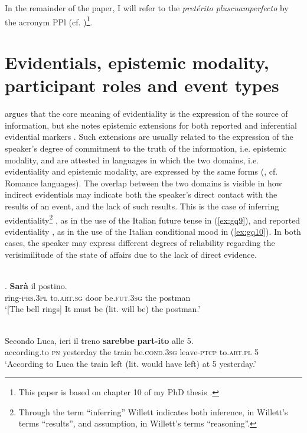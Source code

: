\documentclass[output=paper]{langsci/langscibook}
\begin{document}
In the remainder of the paper, I will refer to the \textit{pretérito pluscuamperfecto} by the acronym PPl (cf. \citealt{Speranza2014})\footnote{This paper is based on chapter 10 of my PhD thesis \citep{Quartararo2017}.}.


\section{Evidentials, epistemic modality, participant roles and event types}\label{s:gq2}

\citet[3]{Aikhenvald2004} argues that the core meaning of evidentiality is the expression of the source of information, but she notes epistemic extensions for both reported \citep[180]{Aikhenvald2004} and inferential evidential markers \citep[176]{Aikhenvald2004}. Such extensions are usually related to the expression of the speaker’s degree of commitment to the truth of the information, i.e. epistemic modality, and are attested in languages in which the two domains, i.e. evidentiality and epistemic modality, are expressed by the same forms (\citealt[354]{Plungian2001}, cf. Romance languages). The overlap between the two domains is visible in how indirect evidentials may indicate both the speaker’s direct contact with the results of an event, and the lack of such results. This is the case of inferring evidentiality\footnote{Through the term “inferring” Willett indicates both inference, in Willett’s terms “results”, and assumption, in Willett’s terms “reasoning”.} \citep[57]{Willett1988}, as in the use of the Italian future tense in (\ref{ex:gq9}), and reported evidentiality \citep[57]{Willett1988}, as in the use of the Italian conditional mood in (\ref{ex:gq10}). In both cases, the speaker may express different degrees of reliability regarding the verisimilitude of the state of affairs due to the lack of direct evidence.


\ea \label{ex:gq9}
	\\
	. \textbf{Sarà} il postino.\\
	ring-\textsc{prs.3pl} to.\textsc{art.sg} door be.\textsc{fut.3sg} the postman\\
	\glt ‘[The bell rings] It must be (lit. will be) the postman.’
\z


\ea \label{ex:gq10}
	\\
	\gll Secondo Luca, ieri il treno \textbf{sarebbe} \textbf{part-ito} alle 5.\\
	according.to \textsc{pn} yesterday the train be.\textsc{cond.3sg} leave-\textsc{ptcp} to.\textsc{art.pl} 5\\
	\glt ‘According to Luca the train left (lit. would have left) at 5 yesterday.’
\z
\end{document}
